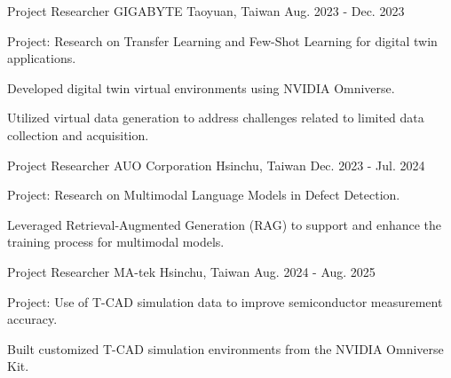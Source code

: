

\begin{cventries}

  \cventry
    {Project Researcher} %
    {GIGABYTE} %
    {Taoyuan, Taiwan} %
    {Aug. 2023 - Dec. 2023} %
    {
      \begin{cvitems} %
        \item {Project: Research on Transfer Learning and Few-Shot Learning for digital twin applications.}
        \item {Developed digital twin virtual environments using NVIDIA Omniverse.}
        \item {Utilized virtual data generation to address challenges related to limited data collection and acquisition.}
      \end{cvitems}
    }

  \cventry
    {Project Researcher} %
    {AUO Corporation} %
    {Hsinchu, Taiwan} %
    {Dec. 2023 - Jul. 2024} %
    {
      \begin{cvitems} %
        \item {Project: Research on Multimodal Language Models in Defect Detection.}
        \item {Leveraged Retrieval-Augmented Generation (RAG) to support and enhance the training process for multimodal models.}
      \end{cvitems}
    }

  \cventry
    {Project Researcher} %
    {MA-tek} %
    {Hsinchu, Taiwan} %
    {Aug. 2024 - Aug. 2025} %
    {
      \begin{cvitems} %
        \item {Project: Use of T-CAD simulation data to improve semiconductor measurement accuracy.}
        \item {Built customized T-CAD simulation environments from the NVIDIA Omniverse Kit.}
      \end{cvitems}
    }

\end{cventries}